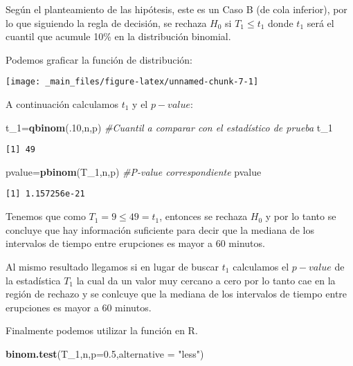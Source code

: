 \documentclass[
  a4paper,
  oneside,
  openany]{book}
\newenvironment{Shaded}{\begin{snugshade}}{\end{snugshade}}
\newcommand{\AttributeTok}[1]{\textcolor[rgb]{0.13,0.29,0.53}{#1}}
\newcommand{\CommentTok}[1]{\textcolor[rgb]{0.56,0.35,0.01}{\textit{#1}}}
\newcommand{\DecValTok}[1]{\textcolor[rgb]{0.00,0.00,0.81}{#1}}
\newcommand{\FloatTok}[1]{\textcolor[rgb]{0.00,0.00,0.81}{#1}}
\newcommand{\FunctionTok}[1]{\textcolor[rgb]{0.13,0.29,0.53}{\textbf{#1}}}
\newcommand{\NormalTok}[1]{#1}
\newcommand{\OtherTok}[1]{\textcolor[rgb]{0.56,0.35,0.01}{#1}}
\newcommand{\StringTok}[1]{\textcolor[rgb]{0.31,0.60,0.02}{#1}}
\begin{document}
Según el planteamiento de las hipótesis, este es un Caso B (de cola inferior), por lo que siguiendo la regla de decisión, se rechaza \(H_0\) si \(T_1\leq t_1\) donde \(t_1\) será el cuantil que acumule 10\% en la distribución binomial.

Podemos graficar la función de distribución:

\begin{center}\texttt{[image: \_main\_files/figure-latex/unnamed-chunk-7-1]} \end{center}

A continuación calculamos \(t_1\) y el \(p-value\):

\begin{Shaded}
\begin{Highlighting}[]
\NormalTok{t\_1}\OtherTok{=}\FunctionTok{qbinom}\NormalTok{(.}\DecValTok{10}\NormalTok{,n,p)        }\CommentTok{\#Cuantil a comparar con el estadístico de prueba}
\NormalTok{t\_1}
\end{Highlighting}
\end{Shaded}

\begin{verbatim}
[1] 49
\end{verbatim}

\begin{Shaded}
\begin{Highlighting}[]
\NormalTok{pvalue}\OtherTok{=}\FunctionTok{pbinom}\NormalTok{(T\_1,n,p)     }\CommentTok{\#P{-}value correspondiente}
\NormalTok{pvalue}
\end{Highlighting}
\end{Shaded}

\begin{verbatim}
[1] 1.157256e-21
\end{verbatim}

Tenemos que como \(T_1=9\leq 49 =t_1\), entonces se rechaza \(H_0\) y por lo tanto se concluye que hay información suficiente para decir que la mediana de los intervalos de tiempo entre erupciones es mayor a 60 minutos.

Al mismo resultado llegamos si en lugar de buscar \(t_1\) calculamos el \(p-value\) de la estadística \(T_1\) la cual da un valor muy cercano a cero por lo tanto cae en la región de rechazo y se conlcuye que la mediana de los intervalos de tiempo entre erupciones es mayor a 60 minutos.

Finalmente podemos utilizar la función en R.

\begin{Shaded}
\begin{Highlighting}[]
\FunctionTok{binom.test}\NormalTok{(T\_1,n,}\AttributeTok{p=}\FloatTok{0.5}\NormalTok{,}\AttributeTok{alternative =} \StringTok{"less"}\NormalTok{)}
\end{Highlighting}
\end{Shaded}
\end{document}

